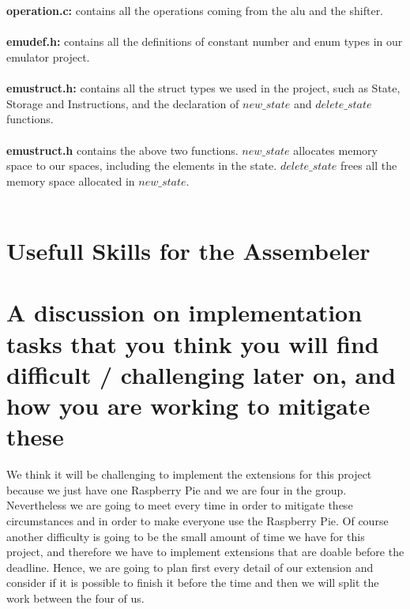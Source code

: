 \documentclass[a4paper]{article}
\begin{document}
\\\\
\textbf{operation.c:} contains all the operations coming from the alu and the shifter.
\\\\
\textbf{emudef.h:} contains all the definitions of constant number and enum types in our emulator project.
\\\\
\textbf{emustruct.h:} contains all the struct types we used in the project, such as State, Storage and Instructions, and the declaration of $new\_state$ and $delete\_state$ functions.
\\\\
\textbf{emustruct.h} contains the above two functions. $new\_state$ allocates memory space to our spaces, including the elements in the state. $delete\_state$ frees all the memory space allocated in $new\_state$.
\\\\


\section{Usefull Skills for the Assembeler}

\section{A discussion on implementation tasks that you think you will find difficult / challenging later on,
and how you are working to mitigate these}
We think it will be challenging to implement the extensions for this project because we just have one Raspberry Pie and we are four in the group. Nevertheless we are going to meet every time in order to mitigate these circumstances and in order to make everyone use the Raspberry Pie.
Of course another difficulty is going to be the small amount of time we have for this project, and therefore we have to implement extensions that are doable before the deadline. Hence, we are going to plan first every detail of our extension and consider if it is possible to finish it before the time and then we will split the work between the four of us.
\end{document}
